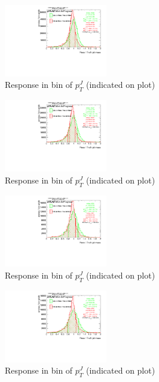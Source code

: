 \begin{figure}

\includegraphics[width=0.4\textwidth]{appendixB/mTAS_W_calibmCal_20:07:01-03-11-2016/8ResponsePTJ_h_JetRatio_mJ06CALO.pdf}
\caption{Response in bin of  $p_{T}^{J}$ (indicated on plot)} 

\end{figure}

\begin{figure}

\includegraphics[width=0.4\textwidth]{appendixB/mTAS_W_calibmCal_20:07:01-03-11-2016/8ResponsePTJ_h_JetRatio_mJ07CALO.pdf}
\caption{Response in bin of  $p_{T}^{J}$ (indicated on plot)} 

\end{figure}

\clearpage

\begin{figure}

\includegraphics[width=0.4\textwidth]{appendixB/mTAS_W_calibmCal_20:07:01-03-11-2016/8ResponsePTJ_h_JetRatio_mJ08CALO.pdf}
\caption{Response in bin of  $p_{T}^{J}$ (indicated on plot)} 

\end{figure}

\begin{figure}

\includegraphics[width=0.4\textwidth]{appendixB/mTAS_W_calibmCal_20:07:01-03-11-2016/8ResponsePTJ_h_JetRatio_mJ09CALO.pdf}
\caption{Response in bin of  $p_{T}^{J}$ (indicated on plot)} 

\end{figure}

